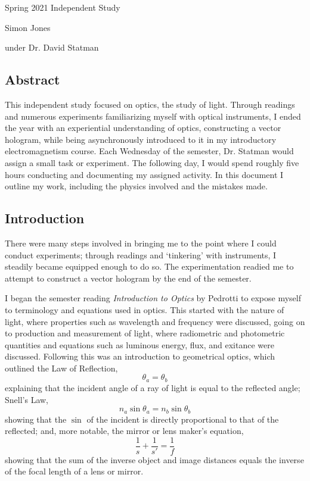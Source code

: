 \documentclass[12pt]{article}
\begin{document}
\begin{center}
  \large Spring 2021 Independent Study

  \normalsize Simon Jones

  \footnotesize under Dr. David Statman
\end{center}
\vspace{-15px}
\noindent
\subsection*{Abstract}
This independent study focused on optics, the study of light. Through readings and numerous experiments familiarizing myself with optical instruments, I ended the year with an experiential understanding of optics, constructing a vector hologram, while being asynchronously introduced to it in my introductory electromagnetism course. Each Wednesday of the semester, Dr. Statman would assign a small task or experiment. The following day, I would spend roughly five hours conducting and documenting my assigned activity. In this document I outline my work, including the physics involved and the mistakes made.

\subsection*{Introduction}
There were many steps involved in bringing me to the point where I could conduct experiments; through readings and `tinkering' with instruments, I steadily became equipped enough to do so. The experimentation readied me to attempt to construct a vector hologram by the end of the semester.

I began the semester reading \textit{Introduction to Optics} by Pedrotti \autocite{pedrotti} to expose myself to terminology and equations used in optics. This started with the nature of light, where properties such as wavelength and frequency were discussed, going on to production and measurement of light, where radiometric and photometric quantities and equations such as luminous energy, flux, and exitance were discussed. Following this was an introduction to geometrical optics, which outlined the Law of Reflection,
\[\theta_a=\theta_b\]
explaining that the incident angle of a ray of light is equal to the reflected angle; Snell's Law,
\[n_a\sin{\theta_a}=n_b\sin{\theta_b}\]
showing that the $\sin$ of the incident is directly proportional to that of the reflected; and, more notable, the mirror or lens maker's equation,
\begin{equation}\label{lensmakers}
\frac{1}{s}+\frac{1}{s'}=\frac{1}{f}
\end{equation}
showing that the sum of the inverse object and image distances equals the inverse of the focal length of a lens or mirror. \autocite[1-61]{pedrotti}
\end{document}
